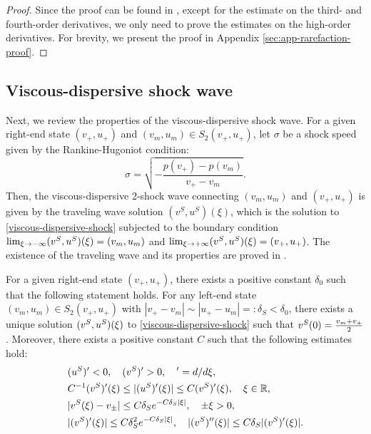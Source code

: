 \documentclass[11pt,reqno]{amsart}
\begin{document}
    \begin{proof} Since the proof can be found in \cite{MN86}, except for the estimate on the third- and fourth-order derivatives, we only need to prove the estimates on the high-order derivatives. For brevity, we present the proof in Appendix \ref{sec:app-rarefaction-proof}. 
    \end{proof}


    \subsection{Viscous-dispersive shock wave}
    Next, we review the properties of the viscous-dispersive shock wave. For a given right-end state $(v_+,u_+)$ and $(v_m,u_m)\in S_2(v_+,u_+)$, let $\sigma$ be a shock speed given by the Rankine-Hugoniot condition:
    \[\sigma =\sqrt{-\frac{p(v_+)-p(v_m)}{v_+-v_m}}.\]
    Then, the viscous-dispersive 2-shock wave connecting $(v_m,u_m)$ and $(v_+,u_+)$ is given by the traveling wave solution $(v^S,u^S)(\xi)$, which is the solution to \eqref{viscous-dispersive-shock}	subjected to the boundary condition $\lim_{\xi\to-\infty}(v^S,u^S)(\xi)=(v_m,u_m)$ and $\lim_{\xi\to+\infty}(v^S,u^S)(\xi)=(v_+,u_+)$. The existence of the traveling wave and its properties are proved in \cite[Appendix B]{HKKL_pre}.
    
    \begin{lemma}\label{lem:shock-property}
        For a given right-end state $(v_+,u_+)$, there exists a positive constant $\delta_0$ such that the following statement holds. For any left-end state $(v_m,u_m) \in S_2(v_+,u_+)$ with $|v_+-v_m| \sim |u_+ - u_m|=:\delta_S<\delta_0$, there exists a unique solution $(v^S,u^S)(\xi)$ to \eqref{viscous-dispersive-shock} such that $v^S(0)=\frac{v_m+v_+}{2}$. Moreover, there exists a positive constant $C$ such that the following estimates hold:
        \begin{equation}
        \begin{aligned}\label{shock-property}
        & (u^S)'<0,\quad (v^S)'>0,\quad ' = d/d\xi,\\
        &C^{-1} (v^S)'(\xi) \le |(u^S)'(\xi)| \le C (v^S)' (\xi), \quad \xi \in \mathbb{R},\\
        &|v^S(\xi)-v_\pm|\le C\delta_Se^{-C\delta_S|\xi|},\quad \pm \xi>0,\\
        &|(v^S)'(\xi)|\le C\delta_S^2e^{-C\delta_S|\xi|},\quad |(v^S)''(\xi)|\le C\delta_S|(v^S)'(\xi)|.
        \end{aligned}
        \end{equation}
    \end{lemma}
        
\end{document}
